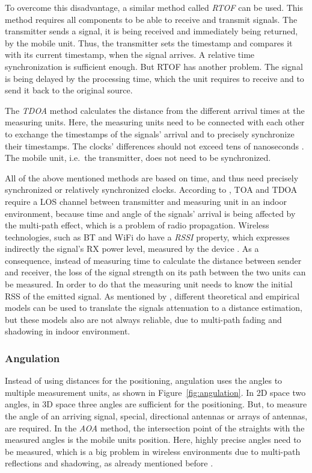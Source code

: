 To overcome this disadvantage, a similar method called \emph{\ac{RTOF}} can be used. This method requires all components to be able to receive and transmit signals. The transmitter sends a signal, it is being received and immediately being returned, by the mobile unit. Thus, the transmitter sets the timestamp and compares it with its current timestamp, when the signal arrives. A relative time synchronization is sufficient enough. But \ac{RTOF} has another problem. The signal is being delayed by the processing time, which the unit requires to receive and to send it back to the original source.

The \emph{\ac{TDOA}} method calculates the distance from the different arrival times at the measuring units. Here, the measuring units need to be connected with each other to exchange the timestamps of the signals' arrival and to precisely synchronize their timestamps. The clocks' differences should not exceed tens of nanoseconds \citep{kotanen:exp_local_pos_bt}. The mobile unit, i.e.\ the transmitter, does not need to be synchronized. 

All of the above mentioned methods are based on time, and thus need precisely synchronized or relatively synchronized clocks. According to \citet{IEEE:survey_wireless_indoor_pos}, \ac{TOA} and \ac{TDOA} require a \ac{LOS} channel between transmitter and measuring unit in an indoor environment, because time and angle of the signals' arrival is being affected by the multi-path effect, which is a problem of radio propagation. Wireless technologies, such as \acl{BT} and WiFi do have a \emph{\ac{RSSI}} property, which expresses indirectly the signal's \ac{RX} power level, measured by the device \citep{kotanen:exp_local_pos_bt}. As a consequence, instead of measuring time to calculate the distance between sender and receiver, the loss of the signal strength on its path between the two units can be measured. In order to do that the measuring unit needs to know the initial \ac{RSS} of the emitted signal. As mentioned by \citet{IEEE:survey_wireless_indoor_pos}, different theoretical and empirical models can be used to translate the signals attenuation to a distance estimation, but these models also are not always reliable, due to multi-path fading and shadowing in indoor environment.

\subsubsection*{Angulation}
Instead of using distances for the positioning, angulation uses the angles to multiple measurement units, as shown in Figure~\ref{fig:angulation}. In 2D space two angles, in 3D space three angles are sufficient for the positioning. But, to measure the angle of an arriving signal, special, directional antennas or arrays of antennas, are required. In the \emph{\ac{AOA}} method, the intersection point of the straights with the measured angles is the mobile units position. Here, highly precise angles need to be measured, which is a big problem in wireless environments due to multi-path reflections and shadowing, as already mentioned before \citep{IEEE:survey_wireless_indoor_pos, wang:bt_pos}.

